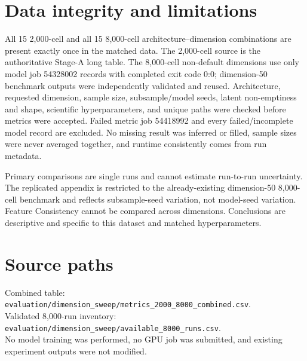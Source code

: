 \documentclass[10pt]{article}
\begin{document}
\section{Data integrity and limitations}
All 15 2,000-cell and all 15 8,000-cell architecture--dimension combinations are present exactly once in the matched data. The 2,000-cell source is the authoritative Stage-A long table. The 8,000-cell non-default dimensions use only model job 54328002 records with completed exit code 0:0; dimension-50 benchmark outputs were independently validated and reused. Architecture, requested dimension, sample size, subsample/model seeds, latent non-emptiness and shape, scientific hyperparameters, and unique paths were checked before metrics were accepted. Failed metric job 54418992 and every failed/incomplete model record are excluded. No missing result was inferred or filled, sample sizes were never averaged together, and runtime consistently comes from run metadata.

Primary comparisons are single runs and cannot estimate run-to-run uncertainty. The replicated appendix is restricted to the already-existing dimension-50 8,000-cell benchmark and reflects subsample-seed variation, not model-seed variation. Feature Consistency cannot be compared across dimensions. Conclusions are descriptive and specific to this dataset and matched hyperparameters.

\appendix\section{Source paths}
Combined table: \texttt{evaluation/dimension\_sweep/metrics\_2000\_8000\_combined.csv}.\\
Validated 8,000-run inventory: \texttt{evaluation/dimension\_sweep/available\_8000\_runs.csv}.\\
No model training was performed, no GPU job was submitted, and existing experiment outputs were not modified.
\end{document}
